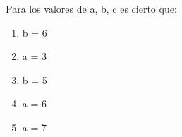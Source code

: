 {
Para los valores de a, b, c  es cierto que:
\begin{enumerate}
	\item b = 6
	\item a = 3 
	\item b = 5 %
	\item a = 6
	\item a = 7
\end{enumerate}
}
